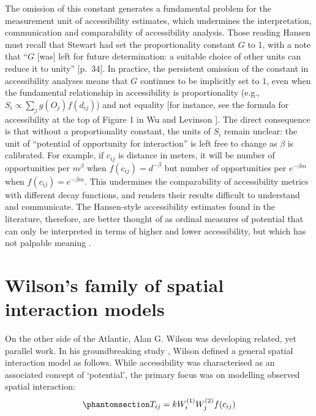 \documentclass[
  10pt,
  letterpaper,
]{article}
\begin{document}
The omission of this constant generates a fundamental problem for the
measurement unit of accessibility estimates, which undermines the
interpretation, communication and comparability of accessibility
analysis. Those reading Hansen \citep{hansen1959} must recall that
Stewart \citep{stewartDemographicGravitationEvidence1948} had set the
proportionality constant \(G\) to 1, with a note that ``\(G\) {[}was{]}
left for future determination: a suitable choice of other units can
reduce it to unity'' {[}p.~34{]}. In practice, the persistent omission
of the constant in accessibility analyses means that \(G\) continues to
be implicitly set to \(1\), even when the fundamental relationship in
accessibility is proportionality (e.g.,
\(S_{i} \propto \sum_j g(O_j)f(d_{ij})\)) and not equality {[}for
instance, see the formula for accessibility at the top of Figure 1 in Wu
and Levinson \citep{wuUnifyingAccess2020}{]}. The direct consequence is
that without a proportionality constant, the units of \(S_i\) remain
unclear: the unit of ``potential of opportunity for interaction'' is
left free to change as \(\beta\) is calibrated. For example, if
\(c_{ij}\) is distance in meters, it will be number of opportunities per
\(m^{\beta}\) when \(f(c_{ij}) = d^{-\beta}\) but number of
opportunities per \(e^{-\beta m}\) when \(f(c_{ij}) = e^{-\beta m}\).
This undermines the comparability of accessibility metrics with
different decay functions, and renders their results difficult to
understand and communicate. The Hansen-style accessibility estimates
found in the literature, therefore, are better thought of as ordinal
measures of potential that can only be interpreted in terms of higher
and lower accessibility, but which has not palpable meaning
\citep{millerAccessibilityMeasurementApplication2018}.

\section{Wilson's family of spatial interaction
models}\label{wilsons-family-of-spatial-interaction-models}

On the other side of the Atlantic, Alan G. Wilson was developing
related, yet parallel work. In his groundbreaking study
\citep{wilson1971}, Wilson defined a general spatial interaction model
as follows. While accessibility was characterised as an associated
concept of `potential', the primary focus was on modelling observed
spatial interaction:
\begin{equation}\phantomsection\label{eq-phys-gravity-model}{
T_{ij} = k W_i^{(1)} W_j^{(2)} f(c_{ij})
}\end{equation}
\end{document}
